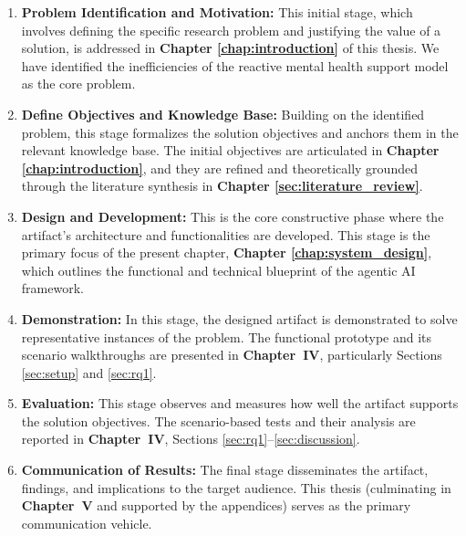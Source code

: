 \begin{enumerate}
    \item \textbf{Problem Identification and Motivation:} This initial stage, which involves defining the specific research problem and justifying the value of a solution, is addressed in \textbf{Chapter \ref{chap:introduction}} of this thesis. We have identified the inefficiencies of the reactive mental health support model as the core problem.

    \item \textbf{Define Objectives and Knowledge Base:} Building on the identified problem, this stage formalizes the solution objectives and anchors them in the relevant knowledge base. The initial objectives are articulated in \textbf{Chapter \ref{chap:introduction}}, and they are refined and theoretically grounded through the literature synthesis in \textbf{Chapter \ref{sec:literature_review}}.

    \item \textbf{Design and Development:} This is the core constructive phase where the artifact's architecture and functionalities are developed. This stage is the primary focus of the present chapter, \textbf{Chapter \ref{chap:system_design}}, which outlines the functional and technical blueprint of the agentic AI framework.

    \item \textbf{Demonstration:} In this stage, the designed artifact is demonstrated to solve representative instances of the problem. The functional prototype and its scenario walkthroughs are presented in \textbf{Chapter~IV}, particularly Sections \ref{sec:setup} and \ref{sec:rq1}.

    \item \textbf{Evaluation:} This stage observes and measures how well the artifact supports the solution objectives. The scenario-based tests and their analysis are reported in \textbf{Chapter~IV}, Sections \ref{sec:rq1}--\ref{sec:discussion}.

    \item \textbf{Communication of Results:} The final stage disseminates the artifact, findings, and implications to the target audience. This thesis (culminating in \textbf{Chapter~V} and supported by the appendices) serves as the primary communication vehicle.
\end{enumerate}

